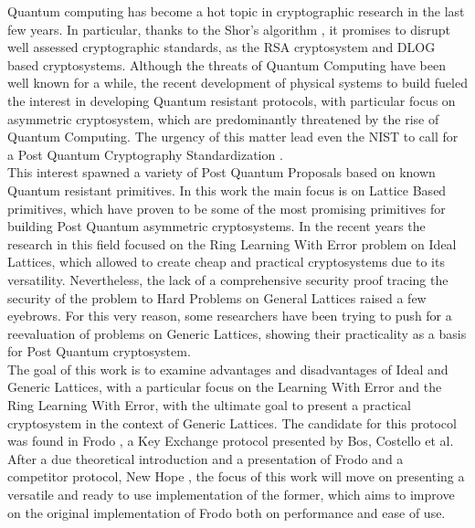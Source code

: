 Quantum computing has become a hot topic in cryptographic research in the last few years. In particular, thanks to the Shor's algorithm \cite{ShorAlgo}, it promises to disrupt well assessed cryptographic standards, as the RSA cryptosystem and DLOG based cryptosystems. Although the threats of Quantum Computing have been well known for a while, the recent development of physical systems to build fueled the interest in developing Quantum resistant protocols, with particular focus on asymmetric cryptosystem, which are predominantly threatened by the rise of Quantum Computing. The urgency of this matter lead even the NIST to call for a Post Quantum Cryptography Standardization \cite{NIST}.\\
This interest spawned a variety of Post Quantum Proposals based on known Quantum resistant primitives. In this work the main focus is on Lattice Based primitives, which have proven to be some of the most promising primitives for building Post Quantum asymmetric cryptosystems. In the recent years the research in this field focused on the Ring Learning With Error problem on Ideal Lattices, which allowed to create cheap and practical cryptosystems due to its versatility. Nevertheless, the lack of a comprehensive security proof tracing the security of the problem to Hard Problems on General Lattices raised a few eyebrows. For this very reason, some researchers have been trying to push for a reevaluation of problems on Generic Lattices, showing their practicality as a basis for Post Quantum cryptosystem.\\
The goal of this work is to examine advantages and disadvantages of Ideal and Generic Lattices, with a particular focus on the Learning With Error and the Ring Learning With Error, with the ultimate goal to present a practical cryptosystem in the context of Generic Lattices. The candidate for this protocol was found in Frodo \cite{frodo}, a Key Exchange protocol presented by Bos, Costello et al. After a due theoretical introduction and a presentation of Frodo and a competitor protocol, New Hope \cite{newhope}, the focus of this work will move on presenting a versatile and ready to use implementation of the former, which aims to improve on the original implementation of Frodo both on performance and ease of use.